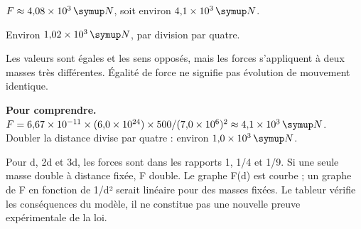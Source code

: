 \clearpage
\par\noindent\begin{minipage}{\linewidth}
\label{cor-defi-10}\begin{questions}
\item $F\approx4{,}08\times10^3\unite N$, soit environ $4{,}1\times10^3\unite N$.
\item Environ $1{,}02\times10^3\unite N$, par division par quatre.
\item Les valeurs sont égales et les sens opposés, mais les forces s’appliquent à deux masses très différentes. Égalité de force ne signifie pas évolution de mouvement identique.
\end{questions}
\par\smallskip\noindent\textbf{Pour comprendre.}\enspace $F=6{,}67\times10^{-11}\times(6{,}0\times10^{24})\times500/(7{,}0\times10^6)^2\approx4{,}1\times10^3\unite N$. Doubler la distance divise par quatre : environ $1{,}0\times10^3\unite N$.\par
{}
\end{minipage}
\par\noindent\begin{minipage}{\linewidth}
\label{cor-activite-10}
Pour d, 2d et 3d, les forces sont dans les rapports 1, 1/4 et 1/9. Si une seule masse double à distance fixée, F double. Le graphe F(d) est courbe ; un graphe de F en fonction de 1/d² serait linéaire pour des masses fixées. Le tableur vérifie les conséquences du modèle, il ne constitue pas une nouvelle preuve expérimentale de la loi.\par\end{minipage}
